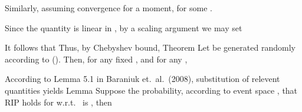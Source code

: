 Similarly, assuming convergence for a moment, for some .

Since the quantity  is linear in , by a scaling argument we may set

It follows that
Thus, by Chebyshev bound,
\Result
{Theorem}
{
Let  be generated randomly according to ().
Then, for any fixed , and for any ,
}

According to Lemma 5.1 in Baraniuk et.\ al.\ (2008), substitution of relevent quantities yields
\Result
{Lemma}
{
Suppose the probability, according to event space , that RIP holds for  w.r.t.\  is , then
}

\stopsubsection
\stopsection




